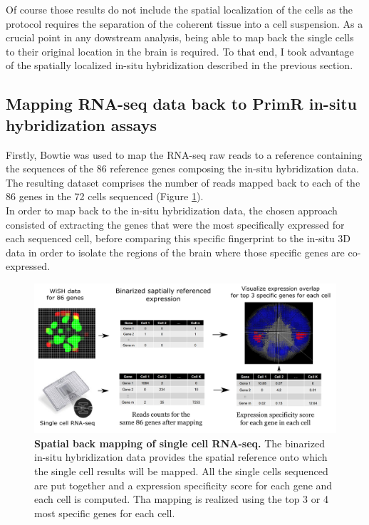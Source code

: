 	Of course those results do not include the spatial localization of the cells as the protocol requires the separation of the coherent tissue into a cell suspension. As a crucial point in any dowstream analysis, being able to map back the single cells to their original location in the brain is required. To that end, I took advantage of the spatially localized in-situ hybridization described in the previous section.\\


  \subsection{Mapping RNA-seq data back to PrimR in-situ hybridization assays}
  	Firstly, Bowtie \citep{langmead12} was used to map the RNA-seq raw reads to a reference containing the sequences of the 86 reference genes composing the in-situ hybridization data. The resulting dataset comprises the number of reads mapped back to each of the 86 genes in the 72 cells sequenced (Figure \ref{fig:backmap}).\\
  	
  	 In order to map back to the in-situ hybridization data, the chosen approach consisted of extracting the genes that were the most specifically expressed for each sequenced cell, before comparing this specific fingerprint to the in-situ 3D data in order to isolate the regions of the brain where those specific genes are co-expressed.\\
  	
	\begin{figure}[h]
\centerline{\includegraphics[width=1.5\linewidth]{gfx/chapter2/backmap.png}}
\caption{{\bf Spatial back mapping of single cell RNA-seq.} The binarized in-situ hybridization data provides the spatial reference onto which the single cell results will be mapped. All the single cells sequenced are put together and a expression specificity score for each gene and each cell is computed. Tha mapping is realized using the top 3 or 4 most specific genes for each cell.}\label{fig:backmap}
	\end{figure}
	
